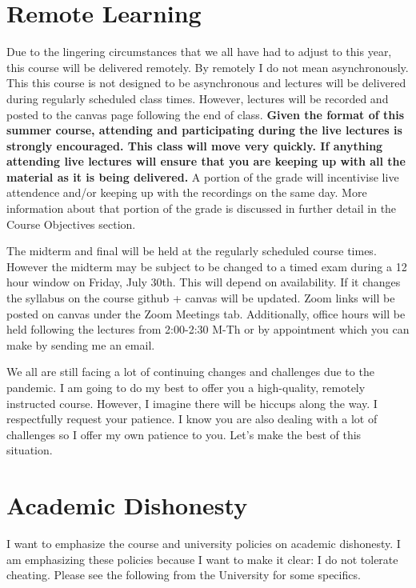 \documentclass[11pt]{article}
\begin{document}
	

	
	
	
	
	\section*{Remote Learning}
	
Due to the lingering circumstances that we all have had to adjust to this year, this course will be delivered remotely. By remotely I do not mean asynchronously. This this course is not designed to be asynchronous and lectures will be delivered during regularly scheduled class times. However, lectures will be recorded and posted to the canvas page following the end of class. \textbf{Given the format of this summer course, attending and participating during the live lectures is strongly encouraged. This class will move very quickly. If anything attending live lectures will ensure that you are keeping up with all the material as it is being delivered.} A portion of the grade will incentivise live attendence and/or keeping up with the recordings on the same day. More information about that portion of the grade is discussed in further detail in the Course Objectives section.

The midterm and final will be held at the regularly scheduled course times. However the midterm may be subject to be changed to a timed exam during a 12 hour window on Friday, July 30th. This will depend on availability. If it changes the syllabus on the course github + canvas will be updated. Zoom links will be posted on canvas under the Zoom Meetings tab. Additionally, office hours will be held following the lectures from 2:00-2:30 M-Th or by appointment which you can make by sending me an email.
	
We all are still facing a lot of continuing changes and challenges due to the pandemic. I am going to do my best to offer you a high-quality, remotely instructed course. However, I imagine there will be hiccups along the way. I respectfully request your patience. I know you are also dealing with a lot of challenges so I offer my own patience to you. Let's make the best of this situation.

\section*{Academic Dishonesty}
 I want to emphasize the course and university policies on academic dishonesty. I am emphasizing these policies because I want to make it clear: I do not tolerate cheating.   Please see the following from the University for some specifics.
	
\end{document}
